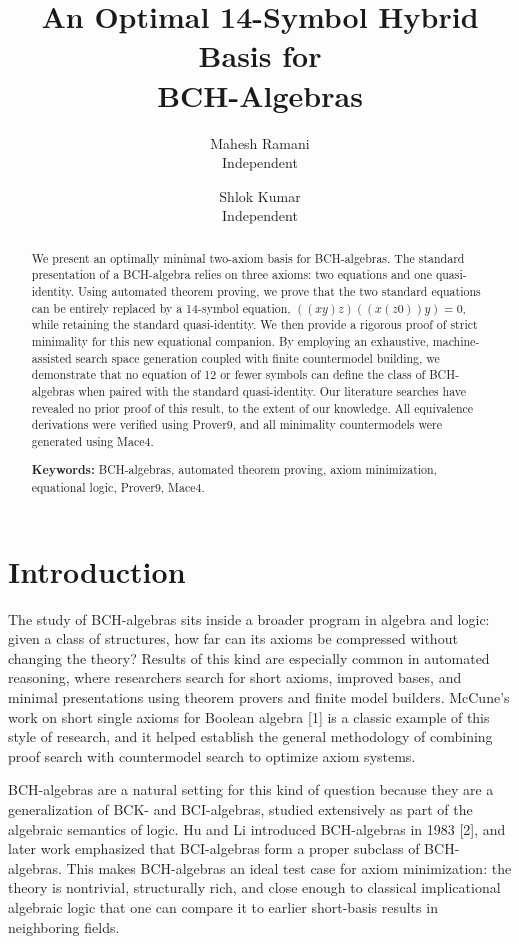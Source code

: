 \documentclass[11pt, a4paper]{article}
\title{\textbf{An Optimal 14-Symbol Hybrid Basis for \\ BCH-Algebras}}
\author{
    Mahesh Ramani \\
    \small Independent
    \and
    Shlok Kumar \\
    \small Independent
}
\date{}
\begin{document}
\maketitle

\begin{abstract}
\noindent We present an optimally minimal two-axiom basis for BCH-algebras. The standard presentation of a BCH-algebra relies on three axioms: two equations and one quasi-identity. Using automated theorem proving, we prove that the two standard equations can be entirely replaced by a 14-symbol equation, $((xy)z)((x(z0))y) = 0$, while retaining the standard quasi-identity. We then provide a rigorous proof of strict minimality for this new equational companion. By employing an exhaustive, machine-assisted search space generation coupled with finite countermodel building, we demonstrate that no equation of 12 or fewer symbols can define the class of BCH-algebras when paired with the standard quasi-identity. Our literature searches have revealed no prior proof of this result, to the extent of our knowledge. All equivalence derivations were verified using Prover9, and all minimality countermodels were generated using Mace4.

\vspace{0.5em}
\noindent \textbf{Keywords:} BCH-algebras, automated theorem proving, axiom minimization, equational logic, Prover9, Mace4.
\end{abstract}

\section{Introduction}
The study of BCH-algebras sits inside a broader program in algebra and logic: given a class of structures, how far can its axioms be compressed without changing the theory? Results of this kind are especially common in automated reasoning, where researchers search for short axioms, improved bases, and minimal presentations using theorem provers and finite model builders. McCune’s work on short single axioms for Boolean algebra [1] is a classic example of this style of research, and it helped establish the general methodology of combining proof search with countermodel search to optimize axiom systems.

BCH-algebras are a natural setting for this kind of question because they are a generalization of BCK- and BCI-algebras, studied extensively as part of the algebraic semantics of logic. Hu and Li introduced BCH-algebras in 1983 [2], and later work emphasized that BCI-algebras form a proper subclass of BCH-algebras. This makes BCH-algebras an ideal test case for axiom minimization: the theory is nontrivial, structurally rich, and close enough to classical implicational algebraic logic that one can compare it to earlier short-basis results in neighboring fields.
\end{document}
